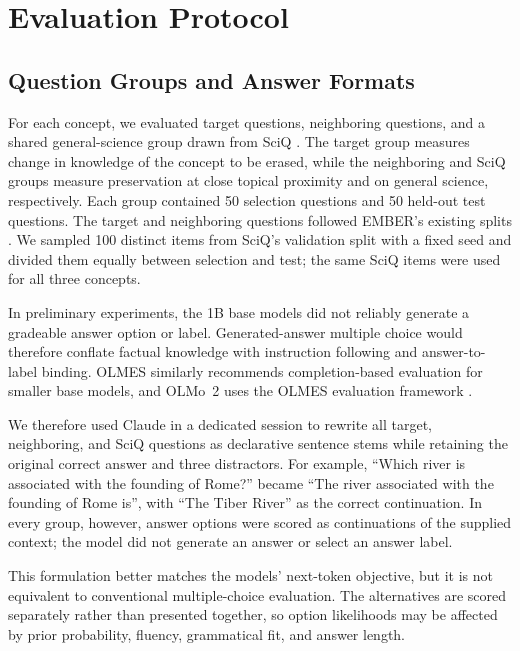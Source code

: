\section{Evaluation Protocol}
\label{sec:evaluation}

\subsection{Question Groups and Answer Formats}
For each concept, we evaluated target questions, neighboring questions, and a
shared general-science group drawn from SciQ \citep{welbl2017sciq}. The target
group measures change in knowledge of the concept to be erased, while the
neighboring and SciQ groups measure preservation at close topical proximity
and on general science, respectively. Each group contained 50 selection
questions and 50 held-out test questions. The target and neighboring questions
followed EMBER's existing splits \citep{suslik2026ember}. We sampled 100
distinct items from SciQ's validation split with a fixed seed and divided them
equally between selection and test; the same SciQ items were used for all three
concepts.

In preliminary experiments, the 1B base models did not reliably generate a
gradeable answer option or label. Generated-answer multiple choice would
therefore conflate factual knowledge with instruction following and
answer-to-label binding. OLMES similarly recommends completion-based
evaluation for smaller base models, and OLMo~2 uses the OLMES evaluation
framework \citep{gu2025olmes,walsh2025olmo2}.

We therefore used Claude in a dedicated session to rewrite all target,
neighboring, and SciQ questions as declarative sentence stems while retaining
the original correct answer and three distractors. For example, ``Which river is
associated with the founding of Rome?'' became ``The river associated with the
founding of Rome is'', with ``The Tiber River'' as the correct continuation.
In every group, however, answer options were scored as continuations of the
supplied context; the model did not generate an answer or select an answer label.

This formulation better matches the models' next-token objective, but it is
not equivalent to conventional multiple-choice evaluation. The alternatives
are scored separately rather than presented together, so option likelihoods
may be affected by prior probability, fluency, grammatical fit, and answer
length.

